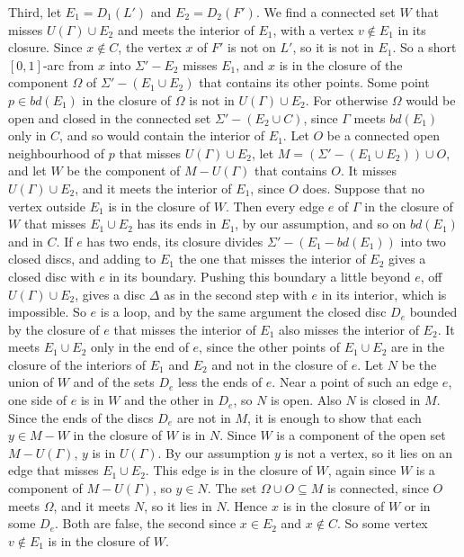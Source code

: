 {Third, let $E_1 = D_1(L')$ and $E_2 = D_2(F')$. We find a connected set $W$ that misses $U(\Gamma) \cup E_2$ and meets the interior of $E_1$, with a vertex $v \notin E_1$ in its closure. Since $x \notin C$, the vertex $x$ of $F'$ is not on $L'$, so it is not in $E_1$. So a short $[0,1]$-arc from $x$ into $\Sigma' - E_2$ misses $E_1$, and $x$ is in the closure of the component $\Omega$ of $\Sigma' - (E_1 \cup E_2)$ that contains its other points. Some point $p \in bd(E_1)$ in the closure of $\Omega$ is not in $U(\Gamma) \cup E_2$. For otherwise $\Omega$ would be open and closed in the connected set $\Sigma' - (E_2 \cup C)$, since $\Gamma$ meets $bd(E_1)$ only in $C$, and so would contain the interior of $E_1$. Let $O$ be a connected open neighbourhood of $p$ that misses $U(\Gamma) \cup E_2$, let $M = (\Sigma' - (E_1 \cup E_2)) \cup O$, and let $W$ be the component of $M - U(\Gamma)$ that contains $O$. It misses $U(\Gamma) \cup E_2$, and it meets the interior of $E_1$, since $O$ does. Suppose that no vertex outside $E_1$ is in the closure of $W$. Then every edge $e$ of $\Gamma$ in the closure of $W$ that misses $E_1 \cup E_2$ has its ends in $E_1$, by our assumption, and so on $bd(E_1)$ and in $C$. If $e$ has two ends, its closure divides $\Sigma' - (E_1 - bd(E_1))$ into two closed discs, and adding to $E_1$ the one that misses the interior of $E_2$ gives a closed disc with $e$ in its boundary. Pushing this boundary a little beyond $e$, off $U(\Gamma) \cup E_2$, gives a disc $\Delta$ as in the second step with $e$ in its interior, which is impossible. So $e$ is a loop, and by the same argument the closed disc $D_e$ bounded by the closure of $e$ that misses the interior of $E_1$ also misses the interior of $E_2$. It meets $E_1 \cup E_2$ only in the end of $e$, since the other points of $E_1 \cup E_2$ are in the closure of the interiors of $E_1$ and $E_2$ and not in the closure of $e$. Let $N$ be the union of $W$ and of the sets $D_e$ less the ends of $e$. Near a point of such an edge $e$, one side of $e$ is in $W$ and the other in $D_e$, so $N$ is open. Also $N$ is closed in $M$. Since the ends of the discs $D_e$ are not in $M$, it is enough to show that each $y \in M - W$ in the closure of $W$ is in $N$. Since $W$ is a component of the open set $M - U(\Gamma)$, $y$ is in $U(\Gamma)$. By our assumption $y$ is not a vertex, so it lies on an edge that misses $E_1 \cup E_2$. This edge is in the closure of $W$, again since $W$ is a component of $M - U(\Gamma)$, so $y \in N$. The set $\Omega \cup O \subseteq M$ is connected, since $O$ meets $\Omega$, and it meets $N$, so it lies in $N$. Hence $x$ is in the closure of $W$ or in some $D_e$. Both are false, the second since $x \in E_2$ and $x \notin C$. So some vertex $v \notin E_1$ is in the closure of $W$.

}
